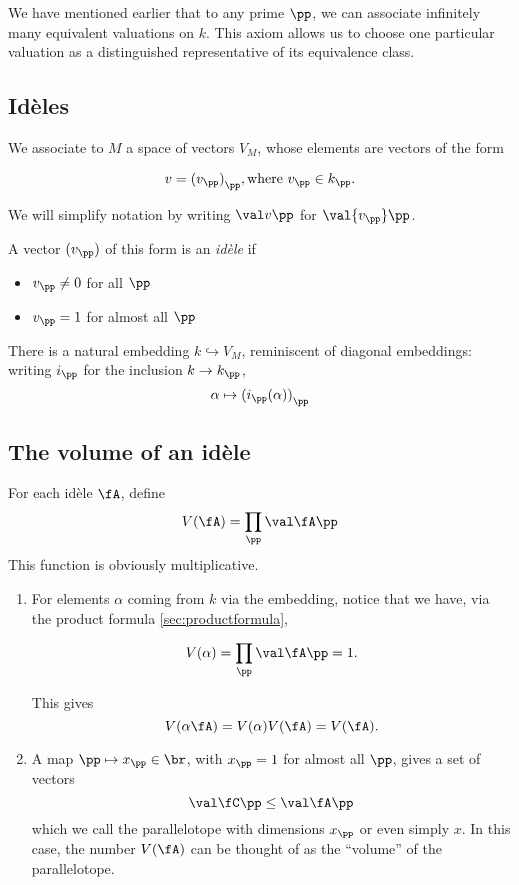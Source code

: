 We have mentioned earlier that to any prime $\pp$, we can associate infinitely
many equivalent valuations on $k$. This axiom allows us to choose one particular
valuation as a distinguished representative of its equivalence class.

\subsection{Id\`eles}
\label{sec:orgheadline19}
We associate to \(M\) a space of vectors $V_M$, whose elements are vectors of
the form

\[ v={ (v_\pp) }_\pp, \text{where } v_\pp \in k_\pp. \]

We will simplify notation by writing \(\val v\pp\) for \(\val{v_\pp}\pp\).

\begin{defn}
  A vector $(v_\pp)$ of this form is an \textit{id\`ele} if
  \begin{itemize}
  \item \(v_\pp\neq 0\) for all \(\pp\)
  \item \(v_\pp = 1\) for almost all \(\pp\)
  \end{itemize}
\end{defn}

There is a natural embedding \(k\hookrightarrow V_M\), reminiscent of diagonal embeddings: writing \(i_\pp\) for the inclusion \(k\to k_\pp\),
\[\alpha\mapsto{ (i_\pp(\alpha)) }_\pp\]

\subsection{The volume of an id\`ele}
\label{sec:orgheadline12}

For each id\`ele \(\fA\), define
\[V(\fA) = \prod_\pp \val\fA\pp \]
This function is obviously multiplicative.

\begin{enumerate}
\item For elements $\alpha$ coming from \(k\) via the embedding, notice that we have, via
  the product formula \ref{sec:productformula},

  \[V(\alpha) = \prod_\pp \val\fA\pp = 1.\]

  This gives \[V(\alpha\fA) = V(\alpha)V(\fA) = V(\fA). \]

\item A map \(\pp\mapsto x_\pp \in\br\), with \(x_\pp = 1\) for almost all
  \(\pp\), gives a set of vectors \[\val \fC\pp \leq \val\fA\pp\] which we call
  the parallelotope with dimensions \(x_\pp\) or even simply \(x\). In this
  case, the number $V(\fA)$ can be thought of as the ``volume'' of the
  parallelotope.

\end{enumerate}

